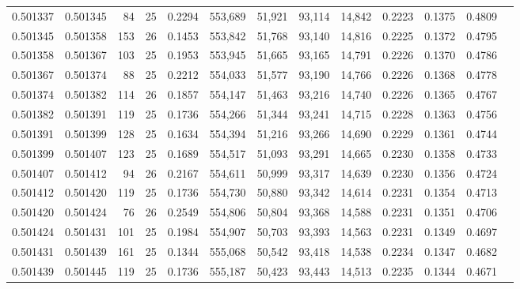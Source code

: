 \begin{tabular}{rrrrrrrrrrrrr}
0.501337 & 0.501345 &  84 &  25 &                                     0.2294 & 553,689 &  51,921 &  93,114 &  14,842 & 0.2223 & 0.1375 & 0.4809 \\
0.501345 & 0.501358 & 153 &  26 &                                     0.1453 & 553,842 &  51,768 &  93,140 &  14,816 & 0.2225 & 0.1372 & 0.4795 \\
0.501358 & 0.501367 & 103 &  25 &                                     0.1953 & 553,945 &  51,665 &  93,165 &  14,791 & 0.2226 & 0.1370 & 0.4786 \\
0.501367 & 0.501374 &  88 &  25 &                                     0.2212 & 554,033 &  51,577 &  93,190 &  14,766 & 0.2226 & 0.1368 & 0.4778 \\
0.501374 & 0.501382 & 114 &  26 &                                     0.1857 & 554,147 &  51,463 &  93,216 &  14,740 & 0.2226 & 0.1365 & 0.4767 \\
0.501382 & 0.501391 & 119 &  25 &                                     0.1736 & 554,266 &  51,344 &  93,241 &  14,715 & 0.2228 & 0.1363 & 0.4756 \\
0.501391 & 0.501399 & 128 &  25 &                                     0.1634 & 554,394 &  51,216 &  93,266 &  14,690 & 0.2229 & 0.1361 & 0.4744 \\
0.501399 & 0.501407 & 123 &  25 &                                     0.1689 & 554,517 &  51,093 &  93,291 &  14,665 & 0.2230 & 0.1358 & 0.4733 \\
0.501407 & 0.501412 &  94 &  26 &                                     0.2167 & 554,611 &  50,999 &  93,317 &  14,639 & 0.2230 & 0.1356 & 0.4724 \\
0.501412 & 0.501420 & 119 &  25 &                                     0.1736 & 554,730 &  50,880 &  93,342 &  14,614 & 0.2231 & 0.1354 & 0.4713 \\
0.501420 & 0.501424 &  76 &  26 &                                     0.2549 & 554,806 &  50,804 &  93,368 &  14,588 & 0.2231 & 0.1351 & 0.4706 \\
0.501424 & 0.501431 & 101 &  25 &                                     0.1984 & 554,907 &  50,703 &  93,393 &  14,563 & 0.2231 & 0.1349 & 0.4697 \\
0.501431 & 0.501439 & 161 &  25 &                                     0.1344 & 555,068 &  50,542 &  93,418 &  14,538 & 0.2234 & 0.1347 & 0.4682 \\
0.501439 & 0.501445 & 119 &  25 &                                     0.1736 & 555,187 &  50,423 &  93,443 &  14,513 & 0.2235 & 0.1344 & 0.4671 \\

\end{tabular}
